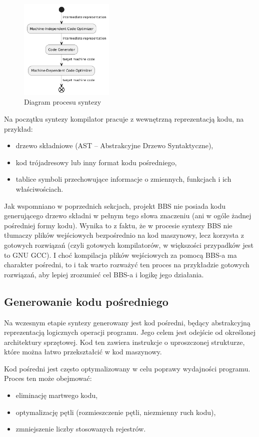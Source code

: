 \begin{figure}[h]
    \centering
    \includegraphics[width=0.4\textwidth]{Images/synthesis.png}
    \caption{Diagram procesu syntezy}
\end{figure}

Na początku syntezy kompilator pracuje z wewnętrzną reprezentacją kodu, na przykład:
\begin{itemize}
    \item drzewo składniowe (AST -- Abstrakcyjne Drzewo Syntaktyczne),
    \item kod trójadresowy lub inny format kodu pośredniego,
    \item tablice symboli przechowujące informacje o zmiennych, funkcjach i ich właściwościach.
\end{itemize}

Jak wspomniano w poprzednich sekcjach, projekt BBS nie posiada kodu generującego drzewo składni w pełnym tego słowa znaczeniu (ani w ogóle żadnej pośredniej formy kodu). Wynika to z faktu, że w procesie syntezy BBS nie tłumaczy plików wejściowych bezpośrednio na kod maszynowy, lecz korzysta z gotowych rozwiązań (czyli gotowych kompilatorów, w większości przypadków jest to GNU GCC). I choć kompilacja plików wejściowych za pomocą BBS-a ma charakter pośredni, to i tak warto rozważyć ten proces na przykładzie gotowych rozwiązań, aby lepiej zrozumieć cel BBS-a i logikę jego działania.

\subsection{Generowanie kodu pośredniego}
Na wczesnym etapie syntezy generowany jest kod pośredni, będący abstrakcyjną reprezentacją logicznych operacji programu. Jego celem jest odejście od określonej architektury sprzętowej. Kod ten zawiera instrukcje o uproszczonej strukturze, które można łatwo przekształcić w kod maszynowy.

Kod pośredni jest często optymalizowany w celu poprawy wydajności programu. Proces ten może obejmować:
\begin{itemize}
    \item eliminację martwego kodu,
    \item optymalizację pętli (rozmieszczenie pętli, niezmienny ruch kodu),
    \item zmniejszenie liczby stosowanych rejestrów.
\end{itemize}

